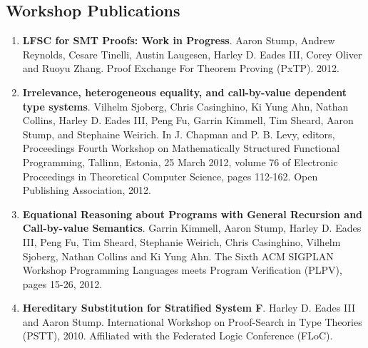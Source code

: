 \documentclass{article}
\begin{document}
  \subsection{Workshop Publications}
  \begin{enumerate}
    
  \item \textbf{LFSC for SMT Proofs: Work in Progress}.
    Aaron Stump, Andrew Reynolds, Cesare Tinelli, Austin Laugesen, Harley D. Eades III, Corey Oliver and Ruoyu Zhang. 
    Proof Exchange For Theorem Proving (PxTP). 2012.
    
  \item \textbf{Irrelevance, heterogeneous equality, and call-by-value dependent type systems}.
    Vilhelm Sjoberg, Chris Casinghino, Ki Yung Ahn, Nathan Collins, Harley D. Eades III, Peng Fu, Garrin Kimmell, Tim Sheard, Aaron Stump, and Stephaine Weirich.
    In J. Chapman and P. B. Levy, editors, Proceedings Fourth Workshop on Mathematically Structured Functional Programming, Tallinn, 
    Estonia, 25 March 2012, volume 76 of Electronic Proceedings in Theoretical Computer Science, pages 112-162. Open Publishing Association, 2012.
    
  \item \textbf{Equational Reasoning about Programs with General Recursion and Call-by-value Semantics}.
    Garrin Kimmell, Aaron Stump, Harley D. Eades III, Peng Fu, Tim Sheard, Stephanie Weirich, 
    Chris Casinghino, Vilhelm Sjoberg, Nathan Collins and Ki Yung Ahn. 
    The Sixth ACM SIGPLAN Workshop Programming Languages meets Program Verification (PLPV), pages 15-26, 2012. 
    
  \item \textbf{Hereditary Substitution for Stratified System F}. Harley D. Eades III and Aaron Stump. 
    International Workshop on Proof-Search in Type Theories (PSTT), 2010. Affiliated with 
    the Federated Logic Conference (FLoC).
  \end{enumerate}
\end{document}
